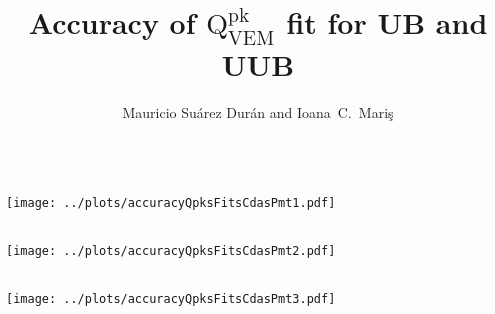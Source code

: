 \documentclass[aspectratio=169]{beamer}
\title{Accuracy of $\mathrm{Q}^{\mathrm{pk}}_{\mathrm{VEM}}$ fit for UB and UUB}
\author{
  Mauricio Su\'arez Dur\'an and Ioana~C.~Mari\c{s}
}
\institute{IIHE-ULB}
\begin{document}
\begin{frame}
  \titlepage
\end{frame}

\begin{frame}
  \begin{columns}
    \begin{column}{1.\textwidth}
      \texttt{[image: ../plots/accuracyQpksFitsCdasPmt1.pdf]}
    \end{column}
  \end{columns}
\end{frame}

\begin{frame}
  \begin{columns}
    \begin{column}{1.\textwidth}
      \texttt{[image: ../plots/accuracyQpksFitsCdasPmt2.pdf]}
    \end{column}
  \end{columns}
\end{frame}

\begin{frame}
  \begin{columns}
    \begin{column}{1.\textwidth}
      \texttt{[image: ../plots/accuracyQpksFitsCdasPmt3.pdf]}
    \end{column}
  \end{columns}
\end{frame}
\end{document}
